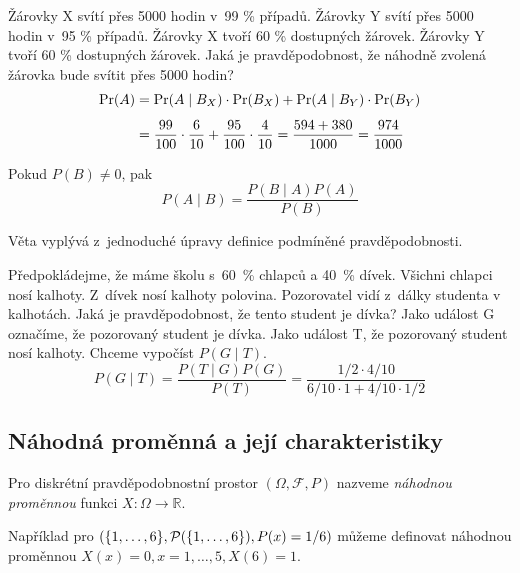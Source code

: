\begin{example}
    Žárovky X svítí přes 5000 hodin v~99 \% případů.
    Žárovky Y svítí přes 5000 hodin v~95 \% případů.
    Žárovky X tvoří 60 \% dostupných žárovek.
    Žárovky Y tvoří 60 \% dostupných žárovek.
    Jaká je pravděpodobnost, že náhodně zvolená žárovka
    bude svítit přes 5000 hodin?
    \[
{\displaystyle {\begin{aligned}\Pr(A)&=\Pr(A\mid B_{X})\cdot \Pr(B_{X})+\Pr(A\mid B_{Y})\cdot \Pr(B_{Y})\\[4pt]&={99 \over 100}\cdot {6 \over 10}+{95 \over 100}\cdot {4 \over 10}={{594+380} \over 1000}={974 \over 1000}\end{aligned}}}
\]
\end{example}

\begin{theorem}[Bayes]
    Pokud $P(B) \neq 0$, pak
    \[
    P(A \mid B) = \frac{P(B \mid A)P(A)}{P(B)}
    \]
\end{theorem}

Věta vyplývá z~jednoduché úpravy definice podmíněné pravděpodobnosti.

\begin{example}
Předpokládejme, že máme školu s~60~\% chlapců
a 40~\% dívek. Všichni chlapci nosí kalhoty.
Z~dívek nosí kalhoty polovina. Pozorovatel vidí z~dálky studenta v kalhotách.
Jaká je pravděpodobnost, že tento student je dívka?
Jako událost G označíme, že pozorovaný student je dívka. Jako událost T,
že pozorovaný student nosí kalhoty. Chceme vypočíst $P(G \mid T)$.
\[
    P(G \mid T)
    = \frac{P(T \mid G)P(G)}{P(T)}
    = \frac{1/2 \cdot 4/10}{6/10 \cdot 1 + 4/10 \cdot 1/2}
\]
\end{example}

\subsection{Náhodná proměnná a její charakteristiky}

\begin{definition}
    Pro diskrétní pravděpodobnostní prostor $(\Omega, \mathcal{F}, P)$
    nazveme {\em náhodnou proměnnou} funkci $X : \Omega \to \mathbb{R}$.
\end{definition}

\begin{example}
    Například pro
    $(\{1,\ldots,6\}, \mathcal{P}(\{1,\ldots,6\}), P(x) = 1/6)$
    můžeme definovat náhodnou proměnnou
    $X(x) = 0, x = 1,\ldots,5, X(6) = 1$.
\end{example}

